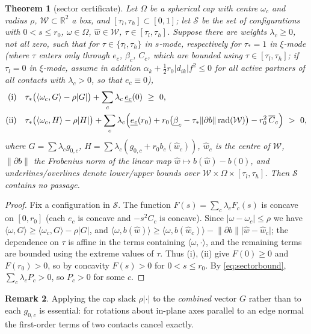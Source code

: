\documentclass[11pt]{amsart}
\newtheorem{theorem}{Theorem}[section]
\theoremstyle{definition}
\newtheorem{remark}[theorem]{Remark}
\newcommand{\R}{\mathbb{R}}
\newcommand{\ip}[2]{\langle #1,#2\rangle}
\newcommand{\abs}[1]{\lvert #1\rvert}
\newcommand{\norm}[1]{\lVert #1\rVert}
\begin{document}
\begin{theorem}[sector certificate]\label{thm:sector}
Let $\Omega$ be a spherical cap with centre $\omega_c$ and radius $\rho$, $\mathcal W\subset\R^2$ a box, and
$[\tau_l,\tau_h]\subset[0,1]$; let $\mathcal S$ be the set of configurations with $0<s\le r_0$, $\omega\in\Omega$,
$\hat w\in\mathcal W$, $\tau\in[\tau_l,\tau_h]$. Suppose there are weights $\lambda_c\ge0$, not all zero, such that
for $\tau\in\{\tau_l,\tau_h\}$ in $s$-mode, respectively for $\tau_\ast=1$ in $\xi$-mode (where $\tau$ enters only through
$e_c$, $\beta_c$, $C_c$, which are bounded using $\tau\in[\tau_l,\tau_h]$; if $\tau_l=0$ in $\xi$-mode, assume in addition
$\alpha_k+\tfrac12r_0\abs{d_{ik}}f^2\le0$ for all active partners of all contacts with $\lambda_c>0$, so that $e_c\equiv0$),
\begin{align*}
\text{(i)}\quad & \tau_\ast\bigl(\ip{\omega_c}{G}-\rho\abs G\bigr)+\sum_c\lambda_c\,\underline{e_c}(0)\ \ge\ 0,\\
\text{(ii)}\quad & \tau_\ast\bigl(\ip{\omega_c}{H}-\rho\abs H\bigr)+\sum_c\lambda_c\Bigl(\underline{e_c}(r_0)+r_0\bigl(\underline\beta_c-\tau_\ast\norm{\partial b}\,\mathrm{rad}(\mathcal W)\bigr)-r_0^2\,\overline C_c\Bigr)\ >\ 0,
\end{align*}
where $G=\sum\lambda_cg_{0,c}$, $H=\sum\lambda_c(g_{0,c}+r_0b_c(\hat w_c))$, $\hat w_c$ is the centre of $\mathcal W$,
$\norm{\partial b}$ the Frobenius norm of the linear map $\hat w\mapsto b(\hat w)-b(0)$, and underlines/overlines denote
lower/upper bounds over $\mathcal W\times\Omega\times[\tau_l,\tau_h]$. Then $\mathcal S$ contains no passage.
\end{theorem}
\begin{proof}
Fix a configuration in $\mathcal S$. The function $F(s)=\sum_c\lambda_cF_c(s)$ is concave on $[0,r_0]$ (each $e_c$ is
concave and $-s^2C_c$ is concave). Since $\abs{\omega-\omega_c}\le\rho$ we have
$\ip\omega G\ge\ip{\omega_c}G-\rho\abs G$, and $\ip\omega{b(\hat w)}\ge\ip\omega{b(\hat w_c)}-\norm{\partial b}\abs{\hat w-\hat w_c}$; the
dependence on $\tau$ is affine in the terms containing $\ip\omega\cdot$, and the remaining terms are bounded using the
extreme values of $\tau$. Thus (i), (ii) give $F(0)\ge0$ and $F(r_0)>0$, so by concavity $F(s)>0$ for $0<s\le r_0$. By
\eqref{eq:sectorbound}, $\sum_c\lambda_cP_c>0$, so $P_c>0$ for some $c$.
\end{proof}

\begin{remark}
Applying the cap slack $\rho\abs{\cdot}$ to the \emph{combined} vector $G$ rather than to each $g_{0,c}$ is essential:
for rotations about in-plane axes parallel to an edge normal the first-order terms of two contacts cancel exactly.
\end{remark}
\end{document}
